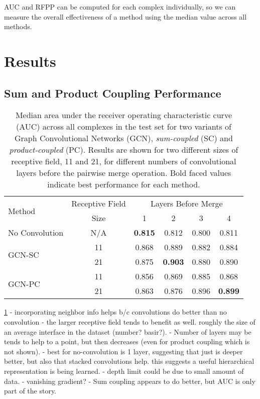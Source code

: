 AUC and RFPP can be computed for each complex individually, so we can measure the overall effectiveness of a method using the median value across all methods. 


\section{Results}

\subsection{Sum and Product Coupling Performance}

\begin{table}
	\begin{center}
		\begin{tabular}{lccccc}
			\toprule
			\multirow{2}{*}{Method} &
			Receptive Field & \multicolumn{4}{c}{Layers Before Merge} \\
			& Size & 1 & {2} & {3} & {4} \\
			\midrule
			No Convolution & N/A & \textbf{0.815} & 0.812 & 0.800 & 0.811  \\\cline{1-6}
			\multirow{2}{*}{GCN-SC} & 11 & 0.868 & 0.889 & 0.882 & 0.884 \\
			& 21 & 0.875 & \textbf{0.903} & 0.880 & 0.890 \\\cline{1-6}
			\multirow{2}{*}{GCN-PC} & 11 & 0.856 & 0.869 & 0.885 & 0.868 \\
			& 21 & 0.863 & 0.876 & 0.896 & \textbf{0.899} \\
			\bottomrule
		\end{tabular}
		\caption{Median area under the receiver operating characteristic curve (AUC) across all complexes in the test set for two variants of Graph Convolutional Networks (GCN), \textit{sum-coupled} (SC) and \textit{product-coupled} (PC). Results are shown for two different sizes of receptive field, 11 and 21, for different numbers of convolutional layers before the pairwise merge operation. Bold faced values indicate best performance for each method.}
		\label{tab:med_auc}
	\end{center}
\end{table}

\ref{tab:med_auc}
	- incorporating neighbor info helps b/c convolutions do better than no convolution
	- the larger receptive field tends to benefit as well. roughly the size of an average interface in the dataset (number? basir?).
	- Number of layers may be tends to help to a point, but then decreases (even for product coupling which is not shown).
		- best for no-convolution is 1 layer, suggesting that just is deeper better, but also that stacked convolutions help. this suggests a useful hierarchical representation is being learned. 
		- depth limit could be due to small amount of data.
		- vanishing gradient?
	- Sum coupling appears to do better, but AUC is only part of the story.
	
